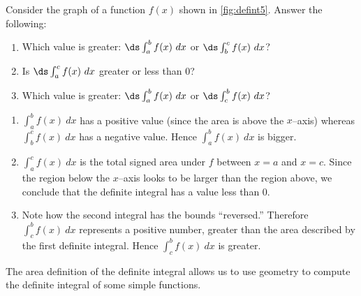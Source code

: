 {Consider the graph of a function $f(x)$ shown in \autoref{fig:defint5}. Answer the following:
%
%
\begin{enumerate}
	\item	Which value is greater: $\ds \int_a^b f(x)\ dx$ or $\ds \int_b^c f(x)\ dx$?
	\item	Is $\ds \int_a^c f(x)\ dx$ greater or less than 0?
	\item	Which value is greater: $\ds \int_a^b f(x)\ dx$ or $\ds \int_c^b f(x)\ dx$?
\end{enumerate}}
{\begin{enumerate}
	\item	$\int_a^b f(x)\ dx$ has a positive value (since the area is above the $x$--axis) whereas $\int_b^c f(x)\ dx$ has a negative value. Hence $\int_a^b f(x)\ dx$ is bigger.
	\item	$\int_a^c f(x)\ dx$ is the total signed area under $f$ between $x=a$ and $x=c$. Since the region below the $x$--axis looks to be larger than the region above, we conclude that the definite integral has a value less than 0.
	\item	Note how the second integral has the bounds ``reversed.'' Therefore $\int_c^b f(x)\ dx$ represents a positive number, greater than the area described by the first definite integral. Hence $\int_c^b f(x)\ dx$ is greater.\eoehere
\end{enumerate}}

The area definition of the definite integral allows us to use geometry to compute the definite integral of some simple functions.

